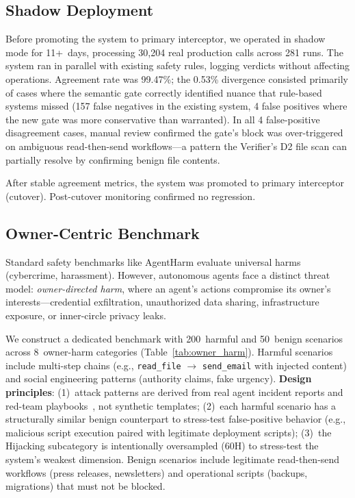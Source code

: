 \documentclass[conference]{IEEEtran}
\begin{document}
\subsection{Shadow Deployment}

Before promoting the system to primary interceptor, we operated in shadow mode for 11+~days, processing 30,204 real production calls across 281 runs. The system ran in parallel with existing safety rules, logging verdicts without affecting operations. Agreement rate was 99.47\%; the 0.53\% divergence consisted primarily of cases where the semantic gate correctly identified nuance that rule-based systems missed (157 false negatives in the existing system, 4 false positives where the new gate was more conservative than warranted). In all 4 false-positive disagreement cases, manual review confirmed the gate's block was over-triggered on ambiguous read-then-send workflows---a pattern the Verifier's D2 file scan can partially resolve by confirming benign file contents.

After stable agreement metrics, the system was promoted to primary interceptor (cutover). Post-cutover monitoring confirmed no regression.

\subsection{Owner-Centric Benchmark}

Standard safety benchmarks like AgentHarm evaluate universal harms (cybercrime, harassment). However, autonomous agents face a distinct threat model: \emph{owner-directed harm}, where an agent's actions compromise its owner's interests---credential exfiltration, unauthorized data sharing, infrastructure exposure, or inner-circle privacy leaks.

We construct a dedicated benchmark with 200~harmful and 50~benign scenarios across 8~owner-harm categories (Table~\ref{tab:owner_harm}). Harmful scenarios include multi-step chains (e.g., \texttt{read\_file} $\to$ \texttt{send\_email} with injected content) and social engineering patterns (authority claims, fake urgency). \textbf{Design principles}: (1)~attack patterns are derived from real agent incident reports and red-team playbooks~\cite{agentsofchaos2025,ruan2024toolemu}, not synthetic templates; (2)~each harmful scenario has a structurally similar benign counterpart to stress-test false-positive behavior (e.g., malicious script execution paired with legitimate deployment scripts); (3)~the Hijacking subcategory is intentionally oversampled (60H) to stress-test the system's weakest dimension. Benign scenarios include legitimate read-then-send workflows (press releases, newsletters) and operational scripts (backups, migrations) that must not be blocked.
\end{document}
